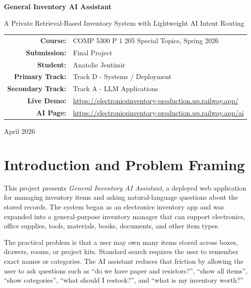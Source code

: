\documentclass[11pt]{article}
\begin{document}
\begin{titlepage}
\centering
\vspace*{1.0in}
{\Huge\bfseries\color{umlblue} General Inventory AI Assistant\par}
\vspace{0.35in}
{\Large A Private Retrieval-Based Inventory System with Lightweight AI Intent Routing\par}
\vspace{0.8in}
\begin{tabular}{rl}
\textbf{Course:} & COMP 5300 P 1 205 Special Topics, Spring 2026 \\
\textbf{Submission:} & Final Project \\
\textbf{Student:} & Anatolie Jentimir \\
\textbf{Primary Track:} & Track D - Systems / Deployment \\
\textbf{Secondary Track:} & Track A - LLM Applications \\
\textbf{Live Demo:} & \url{https://electronicsinventory-production.up.railway.app/} \\
\textbf{AI Page:} & \url{https://electronicsinventory-production.up.railway.app/ai} \\
\end{tabular}
\vfill
{\large April 2026\par}
\end{titlepage}

\section{Introduction and Problem Framing}

This project presents \textit{General Inventory AI Assistant}, a deployed web application for managing inventory items and asking natural-language questions about the stored records. The system began as an electronics inventory app and was expanded into a general-purpose inventory manager that can support electronics, office supplies, tools, materials, books, documents, and other item types.

The practical problem is that a user may own many items stored across boxes, drawers, rooms, or project kits. Standard search requires the user to remember exact names or categories. The AI assistant reduces that friction by allowing the user to ask questions such as ``do we have paper and resistors?'', ``show all items'', ``show categories'', ``what should I restock?'', and ``what is my inventory worth?''
\end{document}
